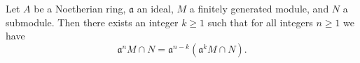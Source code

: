 \documentclass[12pt]{article}
\begin{document}
Let $A$ be a Noetherian ring, $\mathfrak{a}$ an ideal, $M$ a finitely generated module, and $N$ a submodule. Then there exists an integer $k \geq 1$ such that for all integers $n \geq 1$ we have
\[ \mathfrak{a}^nM \cap N = \mathfrak{a}^{n-k}(\mathfrak{a}^kM\cap N). \]
\end{document}
